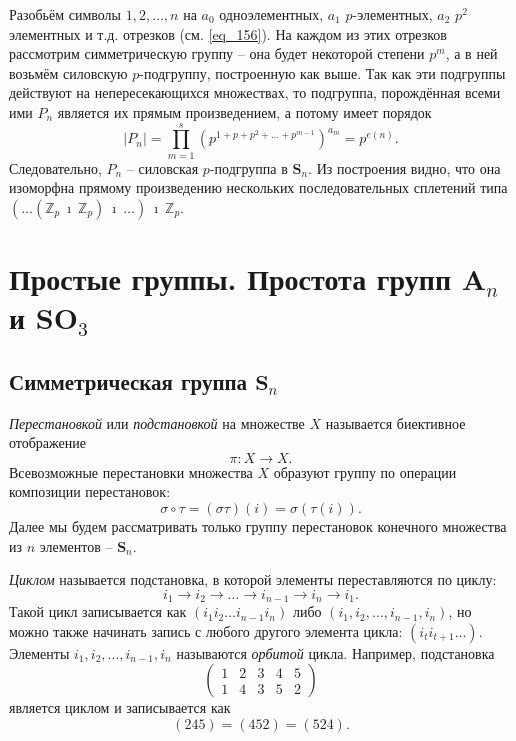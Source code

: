\documentclass{article}
\begin{document}
\begin{enumerate}
    Разобьём символы $1, 2, \ldots, n$ на $a_0$ одноэлементных, $a_1$ $p$-элементных, $a_2$ $p^2$ элементных и т.д. отрезков (см. \eqref{eq_156}). На каждом из этих отрезков рассмотрим симметрическую группу -- она будет некоторой степени $p^m$, а в ней возьмём силовскую $p$-подгруппу, построенную как выше. Так как эти подгруппы действуют на непересекающихся множествах, то подгруппа, порождённая всеми ими $P_n$ является их прямым произведением, а потому имеет порядок
    \[
        |P_n| = \prod_{m = 1}^{s} (p^{1 + p + p^2 + \ldots + p^{m - 1}})^{a_m} = p^{e(n)}.
    \]
    Следовательно, $P_n$ -- силовская $p$-подгруппа в $\mathbf{S}_n$. Из построения видно, что она изоморфна прямому произведению нескольких последовательных сплетений типа $\left( \ldots \left( \mathbb{Z}_p \ \imath \ \mathbb{Z}_p \right) \ \imath \ \ldots \right) \ \imath \ \mathbb{Z}_p$.
\end{enumerate}

\newpage

\section{Простые группы. Простота групп $\mathbf{A}_n$ и $\mathbf{SO}_3$}

\subsection{Симметрическая группа $\mathbf{S}_n$}

\textit{Перестановкой} или \textit{подстановкой} на множестве $X$ называется биективное отображение $$ \pi: X \rightarrow X. $$ Всевозможные перестановки множества $X$ образуют группу по операции композиции перестановок: $$ \sigma \circ \tau = (\sigma \tau) (i) = \sigma(\tau(i)). $$ Далее мы будем рассматривать только группу перестановок конечного множества из $n$ элементов -- $\textbf{S}_n$.

\textit{Циклом} называется подстановка, в которой элементы переставляются по циклу: $$ i_1 \rightarrow i_2 \rightarrow \dots \rightarrow i_{n - 1} \rightarrow i_n \rightarrow i_1. $$ Такой цикл записывается как $(i_1 i_2 \ldots i_{n - 1} i_n)$ либо $(i_1, i_2, \ldots, i_{n - 1}, i_n)$, но можно также начинать запись с любого другого элемента цикла: $(i_t i_{t + 1} \ldots)$. Элементы $i_1, i_2, \ldots, i_{n - 1}, i_n$ называются \textit{орбитой} цикла. Например, подстановка
\[
    \begin{pmatrix}
        1 & 2 & 3 & 4 & 5 \\
        1 & 4 & 3 & 5 & 2
    \end{pmatrix}
\]
является циклом и записывается как $$ (245) = (452) = (524). $$
\end{document}
